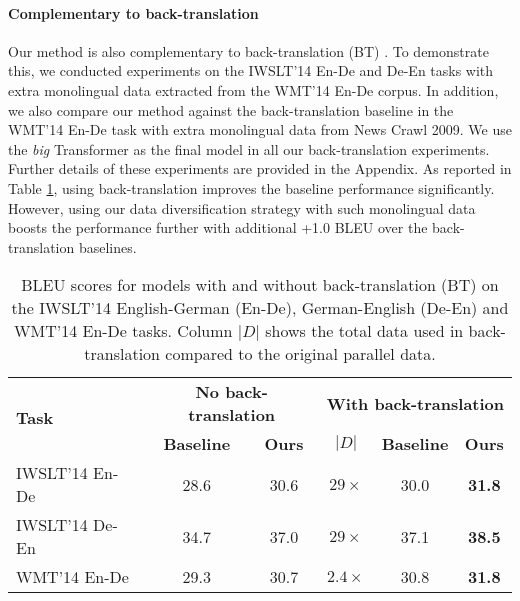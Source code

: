 \documentclass{article}
\begin{document}
\paragraph{Complementary to back-translation}


Our method is also complementary to back-translation (BT) \citep{backtranslate_sennrich-etal-2016-improving}. To demonstrate this, we conducted experiments on the IWSLT'14 En-De and De-En tasks with extra monolingual data extracted from the WMT'14 En-De corpus. In addition, we also compare our method against the back-translation baseline in the WMT'14 En-De task with extra monolingual data from News Crawl 2009. We use the \textit{big} Transformer as the final model in all our back-translation experiments. Further details of these experiments are provided in the Appendix. As reported in Table \ref{table:compare_bt}, using back-translation improves the baseline performance significantly. However, using our data diversification strategy with such monolingual data boosts the performance further with additional +1.0 BLEU over the back-translation baselines.



\begin{table}[hbt!]
\vspace{-0.5em}
\begin{center}
\caption{BLEU scores for models with and without back-translation (BT) on the IWSLT'14 English-German (En-De), German-English (De-En) and WMT'14 En-De tasks. Column $|D|$ shows the total data used in back-translation compared to the original parallel data.}
\begin{tabular}{lccccc}
\toprule
\multirow{2}{*}{\bf Task}   & \multicolumn{2}{c}{\bf No back-translation}     & \multicolumn{3}{c}{\bf With back-translation} \\
\cmidrule{2-6}
{}                      & {\bf Baseline}    & {\bf Ours}    & {\bf $|D|$} & {\bf Baseline}  & {\bf Ours} \\
\midrule
IWSLT'14 En-De	& 28.6	& 30.6	& $29\times$   & 30.0 & \textbf{31.8}\\
IWSLT'14 De-En	& 34.7	& 37.0	& $29\times$   & 37.1  & \textbf{38.5}\\
\midrule
WMT'14 En-De   & 29.3  & 30.7  & $2.4\times$    & 30.8  & \textbf{31.8}\\
\bottomrule
\end{tabular}
\vspace{-1em}
\label{table:compare_bt}
\end{center}
\end{table}
\end{document}
